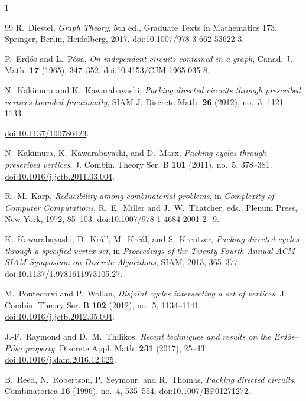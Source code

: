 \documentclass[a4paper,11pt]{article}
\theoremstyle{plain}
\theoremstyle{definition}
\theoremstyle{remark}
\begin{document}
\begin{spacing}{1}
\begin{thebibliography}{99}
R.~Diestel,
\emph{Graph Theory}, 5th ed., Graduate Texts in Mathematics 173,
Springer, Berlin, Heidelberg, 2017.
\href{https://doi.org/10.1007/978-3-662-53622-3}{doi:10.1007/978-3-662-53622-3}.

P.~Erd\H{o}s and L.~P\'osa,
\emph{On independent circuits contained in a graph},
Canad. J. Math. \textbf{17} (1965), 347--352.
\href{https://doi.org/10.4153/CJM-1965-035-8}{doi:10.4153/CJM-1965-035-8}.

N.~Kakimura and K.~Kawarabayashi,
\emph{Packing directed circuits through prescribed vertices bounded
fractionally},
SIAM J. Discrete Math. \textbf{26} (2012), no.~3, 1121--1133.
\par\noindent
\href{https://doi.org/10.1137/100786423}{doi:10.1137/100786423}.

N.~Kakimura, K.~Kawarabayashi, and D.~Marx,
\emph{Packing cycles through prescribed vertices},
J. Combin. Theory Ser. B \textbf{101} (2011), no.~5, 378--381.
\href{https://doi.org/10.1016/j.jctb.2011.03.004}{doi:10.1016/j.jctb.2011.03.004}.

R.~M.~Karp,
\emph{Reducibility among combinatorial problems},
in \emph{Complexity of Computer Computations}, R.~E.~Miller and
J.~W.~Thatcher, eds., Plenum Press, New York, 1972, 85--103.
\href{https://doi.org/10.1007/978-1-4684-2001-2_9}{doi:10.1007/978-1-4684-2001-2\_9}.

K.~Kawarabayashi, D.~Kr\'al', M.~Kr\v{c}\'al, and S.~Kreutzer,
\emph{Packing directed cycles through a specified vertex set},
in \emph{Proceedings of the Twenty-Fourth Annual ACM--SIAM Symposium on
Discrete Algorithms}, SIAM, 2013, 365--377.
\href{https://doi.org/10.1137/1.9781611973105.27}{doi:10.1137/1.9781611973105.27}.

M.~Pontecorvi and P.~Wollan,
\emph{Disjoint cycles intersecting a set of vertices},
J. Combin. Theory Ser. B \textbf{102} (2012), no.~5, 1134--1141.
\href{https://doi.org/10.1016/j.jctb.2012.05.004}{doi:10.1016/j.jctb.2012.05.004}.

J.-F.~Raymond and D.~M.~Thilikos,
\emph{Recent techniques and results on the Erd\H{o}s--P\'osa property},
Discrete Appl. Math. \textbf{231} (2017), 25--43.
\href{https://doi.org/10.1016/j.dam.2016.12.025}{doi:10.1016/j.dam.2016.12.025}.

B.~Reed, N.~Robertson, P.~Seymour, and R.~Thomas,
\emph{Packing directed circuits},
Combinatorica \textbf{16} (1996), no.~4, 535--554.
\href{https://doi.org/10.1007/BF01271272}{doi:10.1007/BF01271272}.

\end{thebibliography}

\end{spacing}
\end{document}
